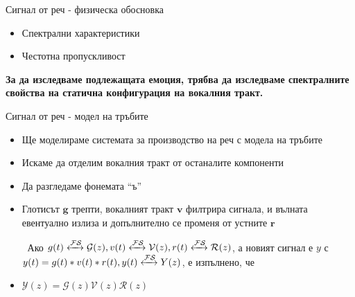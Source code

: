 \documentclass[9pt]{beamer}
\begin{document}
    \begin{frame}{Сигнал от реч - физическа обосновка}
        \begin{itemize}
            \item Спектрални характеристики
            \pause
            \item Честотна пропускливост
        \end{itemize}
        \pause
        \pause
        \textbf{За да изследваме подлежащата емоция, трябва да изследваме спектралните свойства на статична конфигурация на вокалния тракт.}
    \end{frame}

    \begin{frame}{Сигнал от реч - модел на тръбите}
        \begin{itemize}
            \setlength\itemsep{\fill}
            \item Ще моделираме системата за производство на реч с модела на тръбите
            \pause
            \item Искаме да отделим вокалния тракт от останалите компоненти
            \pause
            \item Да разгледаме фонемата ``ъ''
            \pause
            \item Глотисът $\textbf{g}$ трепти, вокалният тракт $\textbf{v}$ филтрира сигнала, и вълната евентуално излиза и допълнително се променя от устните $\textbf{r}$ 
            \pause
            \item[$\ $] Ако  $g(t) \xleftrightarrow{\mathcal{F}\mathcal{S}} \mathcal{G}(z), v(t) \xleftrightarrow{\mathcal{F}\mathcal{S}} \mathcal{V}(z), r(t) \xleftrightarrow{\mathcal{F}\mathcal{S}} \mathcal{R}(z)$, а новият сигнал е $y$ с $y(t)=g(t)\ast v(t) \ast r(t), y(t) \xleftrightarrow{\mathcal{F}\mathcal{S}} Y(z)$, е изпълнено, че
            \pause
            \item $\mathcal{Y}(z) = \mathcal{G}(z) \mathcal{V}(z) \mathcal{R}(z)$
        \end{itemize}
    \end{frame}
\end{document}
